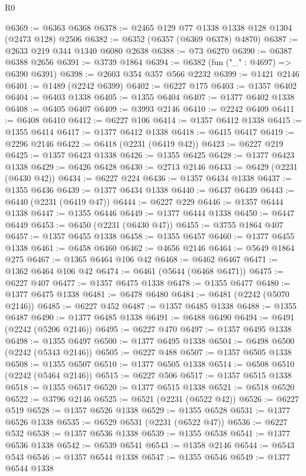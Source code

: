 \begin{lexlean}{R0}
\begin{coremodule}
@6369 := @6363 @6368
@6378 := @2465 @129 @77 @1338 @1338 @128 @1304 (@2473 @128) @2506
@6382 := @6352 (@6357 (@6369 @6378) @4870)
@6387 := @2633 @219 @344 @1340 @6080 @2638
@6388 := @73 @6270
@6390 := @6387 @6388 @2656
@6391 := @3739 @1864
@6394 := @6382 (fun ("_" : @4697) => @6390 @6391)
@6398 := @2603 @354 @357 @566 @2232
@6399 := @1421 @2146
@6401 := @1489 (@2242 @6399)
@6402 := @6227 @175
@6403 := @1357 @6402
@6404 := @6403 @1338
@6405 := @1355 @6404
@6407 := @1377 @6402 @1338
@6408 := @6405 @6407
@6409 := @3993 @2146
@6410 := @2242 @6409
@6411 := @6408 @6410
@6412 := @6227 @106
@6414 := @1357 @6412 @1338
@6415 := @1355 @6414
@6417 := @1377 @6412 @1338
@6418 := @6415 @6417
@6419 := @2296 @2146
@6422 := @6418 (@2231 (@6419 @42))
@6423 := @6227 @219
@6425 := @1357 @6423 @1338
@6426 := @1355 @6425
@6428 := @1377 @6423 @1338
@6429 := @6426 @6428
@6430 := @2713 @2146
@6433 := @6429 (@2231 (@6430 @42))
@6434 := @6227 @224
@6436 := @1357 @6434 @1338
@6437 := @1355 @6436
@6439 := @1377 @6434 @1338
@6440 := @6437 @6439
@6443 := @6440 (@2231 (@6419 @47))
@6444 := @6227 @229
@6446 := @1357 @6444 @1338
@6447 := @1355 @6446
@6449 := @1377 @6444 @1338
@6450 := @6447 @6449
@6453 := @6450 (@2231 (@6430 @47))
@6455 := @3755 @1864 @407
@6457 := @1357 @6455 @1338
@6458 := @1355 @6457
@6460 := @1377 @6455 @1338
@6461 := @6458 @6460
@6462 := @4656 @2146
@6464 := @5649 @1864 @275
@6467 := @1365 @6464 @106 @42
@6468 := @6462 @6467
@6471 := @1362 @6464 @106 @42
@6474 := @6461 (@5644 (@6468 @6471))
@6475 := @6227 @407
@6477 := @1357 @6475 @1338
@6478 := @1355 @6477
@6480 := @1377 @6475 @1338
@6481 := @6478 @6480
@6484 := @6481 (@2242 (@5070 @2146))
@6485 := @6227 @452
@6487 := @1357 @6485 @1338
@6488 := @1355 @6487
@6490 := @1377 @6485 @1338
@6491 := @6488 @6490
@6494 := @6491 (@2242 (@5206 @2146))
@6495 := @6227 @470
@6497 := @1357 @6495 @1338
@6498 := @1355 @6497
@6500 := @1377 @6495 @1338
@6504 := @6498 @6500 (@2242 (@5343 @2146))
@6505 := @6227 @488
@6507 := @1357 @6505 @1338
@6508 := @1355 @6507
@6510 := @1377 @6505 @1338
@6514 := @6508 @6510 (@2242 (@5464 @2146))
@6515 := @6227 @506
@6517 := @1357 @6515 @1338
@6518 := @1355 @6517
@6520 := @1377 @6515 @1338
@6521 := @6518 @6520
@6522 := @3796 @2146
@6525 := @6521 (@2231 (@6522 @42))
@6526 := @6227 @519
@6528 := @1357 @6526 @1338
@6529 := @1355 @6528
@6531 := @1377 @6526 @1338
@6535 := @6529 @6531 (@2231 (@6522 @47))
@6536 := @6227 @532
@6538 := @1357 @6536 @1338
@6539 := @1355 @6538
@6541 := @1377 @6536 @1338
@6542 := @6539 @6541
@6543 := @1358 @2146
@6544 := @6543 @543
@6546 := @1357 @6544 @1338
@6547 := @1355 @6546
@6549 := @1377 @6544 @1338

\end{coremodule}
\end{lexlean}
